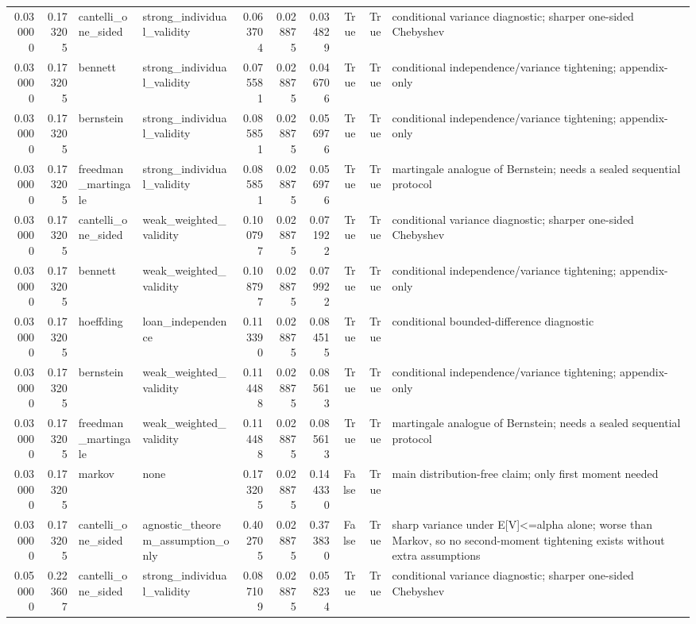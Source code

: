 \begin{tabular}{rrllrrrrrl}
0.030000 & 0.173205 & cantelli\_one\_sided & strong\_individual\_validity & 0.063704 & 0.028875 & 0.034829 & True & True & conditional variance diagnostic; sharper one-sided Chebyshev \\
0.030000 & 0.173205 & bennett & strong\_individual\_validity & 0.075581 & 0.028875 & 0.046706 & True & True & conditional independence/variance tightening; appendix-only \\
0.030000 & 0.173205 & bernstein & strong\_individual\_validity & 0.085851 & 0.028875 & 0.056976 & True & True & conditional independence/variance tightening; appendix-only \\
0.030000 & 0.173205 & freedman\_martingale & strong\_individual\_validity & 0.085851 & 0.028875 & 0.056976 & True & True & martingale analogue of Bernstein; needs a sealed sequential protocol \\
0.030000 & 0.173205 & cantelli\_one\_sided & weak\_weighted\_validity & 0.100797 & 0.028875 & 0.071922 & True & True & conditional variance diagnostic; sharper one-sided Chebyshev \\
0.030000 & 0.173205 & bennett & weak\_weighted\_validity & 0.108797 & 0.028875 & 0.079922 & True & True & conditional independence/variance tightening; appendix-only \\
0.030000 & 0.173205 & hoeffding & loan\_independence & 0.113390 & 0.028875 & 0.084515 & True & True & conditional bounded-difference diagnostic \\
0.030000 & 0.173205 & bernstein & weak\_weighted\_validity & 0.114488 & 0.028875 & 0.085613 & True & True & conditional independence/variance tightening; appendix-only \\
0.030000 & 0.173205 & freedman\_martingale & weak\_weighted\_validity & 0.114488 & 0.028875 & 0.085613 & True & True & martingale analogue of Bernstein; needs a sealed sequential protocol \\
0.030000 & 0.173205 & markov & none & 0.173205 & 0.028875 & 0.144330 & False & True & main distribution-free claim; only first moment needed \\
0.030000 & 0.173205 & cantelli\_one\_sided & agnostic\_theorem\_assumption\_only & 0.402705 & 0.028875 & 0.373830 & False & True & sharp variance under E[V]<=alpha alone; worse than Markov, so no second-moment tightening exists without extra assumptions \\
0.050000 & 0.223607 & cantelli\_one\_sided & strong\_individual\_validity & 0.087109 & 0.028875 & 0.058234 & True & True & conditional variance diagnostic; sharper one-sided Chebyshev \\

\end{tabular}
